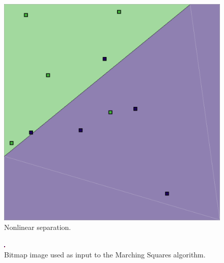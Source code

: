 \documentclass[12pt]{article}
\begin{document}
\begin{figure} 
\centering
  \includegraphics[width = 3 in]{2_res.png}
  \caption{Nonlinear separation.
}
\end{figure}

\begin{figure} 
\centering
  \includegraphics[width = 3 in]{2_res_image.png}
  \caption{Bitmap image used as input to the Marching Squares algorithm.
}
\end{figure}
\end{document}
